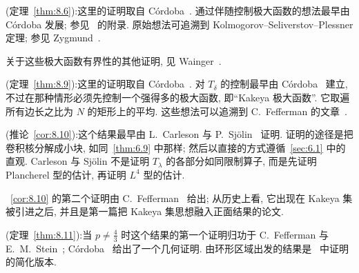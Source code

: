 \noindent (定理~\ref{thm:8.6}):\quad 这里的证明取自 C\'ordoba~\cite{cordoba-kakeya}. 通过伴随控制极大函数的想法最早由 C\'ordoba 发展; 参见~\cite{deguzman} 的附录. 原始想法可追溯到 Kolmogorov--Seliverstov--Plessner 定理; 参见 Zygmund~\cite{zygmund}.

关于这些极大函数有界性的其他证明, 见 Wainger~\cite{wainger-applications}.

\noindent (定理~\ref{thm:8.9}):\quad 这里的证明取自 C\'ordoba~\cite{cordoba-bochnerriesz}. 对 $T_{\delta}$ 的控制最早由 C\'ordoba~\cite{cordoba-kakeya} 建立, 不过在那种情形必须先控制一个强得多的极大函数, 即``Kakeya 极大函数''. 它取遍所有边长之比为 $N$ 的矩形上的平均. 这些想法可以追溯到 C.~Fefferman 的文章~\cite{fefferman-spherical}.

\noindent (推论~\ref{cor:8.10}):\quad 这个结果最早由 L.~Carleson 与 P.~Sj\"olin~\cite{christ} 证明. 证明的途径是把卷积核分解成小块, 如同~\ref*{thm:6.9} 中那样; 然后以直接的方式遵循~\ref*{sec:6.1} 中的直观. Carleson 与 Sj\"olin 不是证明 $T_{\lambda}$ 的各部分如同限制算子, 而是先证明 Plancherel 型的估计, 再证明 $L^{4}$ 型的估计.

~\ref*{cor:8.10} 的第二个证明由 C.~Fefferman~\cite{fefferman-spherical} 给出; 从历史上看, 它出现在 Kakeya 集被引进之后, 并且是第一篇把 Kakeya 集思想融入正面结果的论文.

\noindent (定理~\ref{thm:8.11}):\quad 当 $p\neq\frac{4}{3}$ 时这个结果的第一个证明归功于 C.~Fefferman 与 E.~M.~Stein~\cite{fefferman-spherical}; C\'ordoba~\cite{cordoba-flp} 给出了一个几何证明. 由环形区域出发的结果是~\cite{tomas2} 中证明的简化版本.
